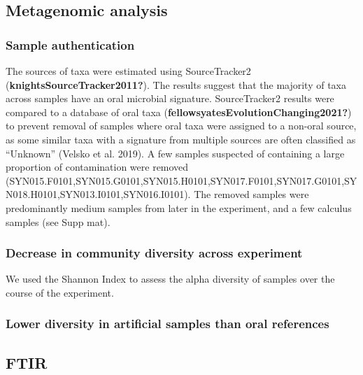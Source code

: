 \documentclass[
]{article}
\begin{document}
\hypertarget{metagenomic-analysis}{%
\subsection{Metagenomic analysis}\label{metagenomic-analysis}}

\hypertarget{sample-authentication}{%
\subsubsection{Sample authentication}\label{sample-authentication}}

The sources of taxa were estimated using SourceTracker2
(\textbf{knightsSourceTracker2011?}). The results suggest that the
majority of taxa across samples have an oral microbial signature.
SourceTracker2 results were compared to a database of oral taxa
(\textbf{fellowsyatesEvolutionChanging2021?}) to prevent removal of
samples where oral taxa were assigned to a non-oral source, as some
similar taxa with a signature from multiple sources are often classified
as ``Unknown'' (Velsko et al. 2019). A few samples suspected of
containing a large proportion of contamination were removed
(SYN015.F0101,SYN015.G0101,SYN015.H0101,SYN017.F0101,SYN017.G0101,SYN018.H0101,SYN013.I0101,SYN016.I0101).
The removed samples were predominantly medium samples from later in the
experiment, and a few calculus samples (see Supp mat).

\hypertarget{decrease-in-community-diversity-across-experiment}{%
\subsubsection{Decrease in community diversity across
experiment}\label{decrease-in-community-diversity-across-experiment}}

We used the Shannon Index to assess the alpha diversity of samples over
the course of the experiment.

\hypertarget{lower-diversity-in-artificial-samples-than-oral-references}{%
\subsubsection{Lower diversity in artificial samples than oral
references}\label{lower-diversity-in-artificial-samples-than-oral-references}}

\hypertarget{ftir-1}{%
\subsection{FTIR}\label{ftir-1}}
\end{document}
